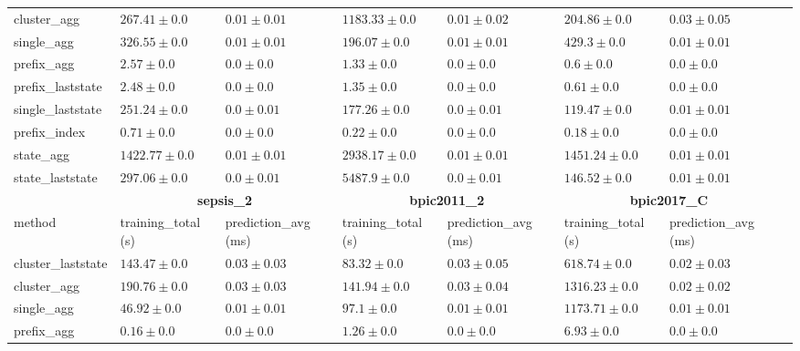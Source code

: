 \begin{table}[!htbp]
{\begin{tabular}{llllllll}
				 cluster\_agg & $267.41 \pm 0.0$ & $0.01 \pm 0.01$ & $1183.33 \pm 0.0$ & $0.01 \pm 0.02$ & $204.86 \pm 0.0$ & $0.03 \pm 0.05$ \\ 
				 single\_agg & $326.55 \pm 0.0$ & $0.01 \pm 0.01$ & $196.07 \pm 0.0$ & $0.01 \pm 0.01$ & $429.3 \pm 0.0$ & $0.01 \pm 0.01$ \\ 
				 prefix\_agg & $2.57 \pm 0.0$ & $\mathbf{0.0 \pm 0.0}$ & $1.33 \pm 0.0$ & $\mathbf{0.0 \pm 0.0}$ & $0.6 \pm 0.0$ & $\mathbf{0.0 \pm 0.0}$ \\ 
				 prefix\_laststate & $2.48 \pm 0.0$ & $\mathbf{0.0 \pm 0.0}$ & $1.35 \pm 0.0$ & $\mathbf{0.0 \pm 0.0}$ & $0.61 \pm 0.0$ & $\mathbf{0.0 \pm 0.0}$ \\ 
				 single\_laststate & $251.24 \pm 0.0$ & $\mathbf{0.0 \pm 0.01}$ & $177.26 \pm 0.0$ & $\mathbf{0.0 \pm 0.01}$ & $119.47 \pm 0.0$ & $0.01 \pm 0.01$ \\ 
				 prefix\_index & $\mathbf{0.71 \pm 0.0}$ & $\mathbf{0.0 \pm 0.0}$ & $\mathbf{0.22 \pm 0.0}$ & $\mathbf{0.0 \pm 0.0}$ & $\mathbf{0.18 \pm 0.0}$ & $\mathbf{0.0 \pm 0.0}$ \\ 
				 state\_agg & $1422.77 \pm 0.0$ & $0.01 \pm 0.01$ & $2938.17 \pm 0.0$ & $0.01 \pm 0.01$ & $1451.24 \pm 0.0$ & $0.01 \pm 0.01$ \\ 
				 state\_laststate & $297.06 \pm 0.0$ & $\mathbf{0.0 \pm 0.01}$ & $5487.9 \pm 0.0$ & $\mathbf{0.0 \pm 0.01}$ & $146.52 \pm 0.0$ & $0.01 \pm 0.01$ \\ 
				 \bottomrule
				 \toprule
				 & \multicolumn{2}{c}{{\bfseries sepsis\_2}} & \multicolumn{2}{c}{{\bfseries bpic2011\_2}} & \multicolumn{2}{c}{{\bfseries bpic2017\_C}} \\ \cmidrule(lr){2-3} \cmidrule(lr){4-5} \cmidrule(lr){6-7}
				 method  & training\_total (s) & prediction\_avg (ms) & training\_total (s) & prediction\_avg (ms) & training\_total (s) & prediction\_avg (ms) \\ \midrule
				 cluster\_laststate & $143.47 \pm 0.0$ & $0.03 \pm 0.03$ & $83.32 \pm 0.0$ & $0.03 \pm 0.05$ & $618.74 \pm 0.0$ & $0.02 \pm 0.03$ \\ 
				 cluster\_agg & $190.76 \pm 0.0$ & $0.03 \pm 0.03$ & $141.94 \pm 0.0$ & $0.03 \pm 0.04$ & $1316.23 \pm 0.0$ & $0.02 \pm 0.02$ \\ 
				 single\_agg & $46.92 \pm 0.0$ & $0.01 \pm 0.01$ & $97.1 \pm 0.0$ & $0.01 \pm 0.01$ & $1173.71 \pm 0.0$ & $0.01 \pm 0.01$ \\ 
				 prefix\_agg & $0.16 \pm 0.0$ & $\mathbf{0.0 \pm 0.0}$ & $1.26 \pm 0.0$ & $\mathbf{0.0 \pm 0.0}$ & $6.93 \pm 0.0$ & $\mathbf{0.0 \pm 0.0}$ \\ 

\end{tabular}}
\end{table}
